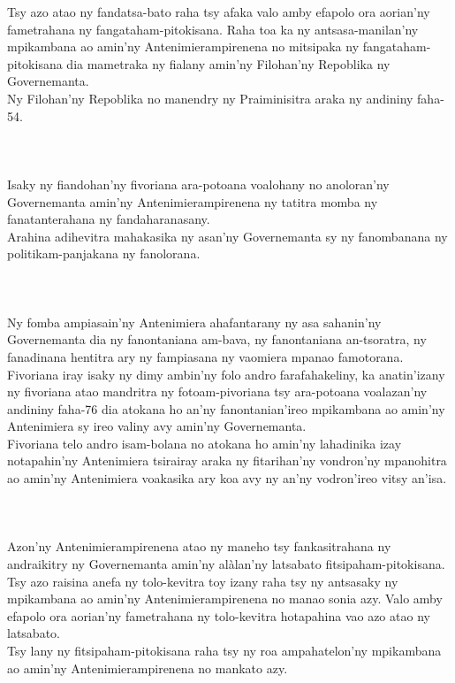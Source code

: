 \documentclass[12pt]{article}
\newcounter{laharana}
\newcommand{\andininy}[0]{
  \paragraph{%
    \NoCaseChange{%
      Andininy~\addtocounter{laharana}{1}\thelaharana.}\label{and:\thelaharana}~%
  }%
}
\begin{document}
\noindent
Tsy azo atao ny fandatsa-bato raha tsy afaka valo amby efapolo ora aorian'ny
fametrahana ny fangataham-pitokisana.  Raha toa ka ny antsasa-manilan'ny
mpikambana ao amin'ny Antenimierampirenena no mitsipaka ny fangataham-pitokisana
dia mametraka ny fialany amin'ny Filohan'ny Repoblika ny Governemanta.\\

\noindent
Ny Filohan'ny Repoblika no manendry ny Praiminisitra araka ny andininy faha- 54.

\andininy{}Isaky ny fiandohan'ny fivoriana ara-potoana voalohany no
anoloran'ny Governemanta amin'ny Antenimierampirenena ny tatitra momba ny
fanatanterahana ny fandaharanasany.\\

\noindent
Arahina adihevitra mahakasika ny asan'ny Governemanta sy ny fanombanana ny
politikam-panjakana ny fanolorana.

\andininy{}Ny fomba ampiasain'ny Antenimiera ahafantarany ny asa sahanin'ny
Governemanta dia ny fanontaniana am-bava, ny fanontaniana an-tsoratra, ny
fanadinana hentitra ary ny fampiasana ny vaomiera mpanao famotorana.\\

\noindent
Fivoriana iray isaky ny dimy ambin'ny folo andro farafahakeliny, ka anatin'izany
ny fivoriana atao mandritra ny fotoam-pivoriana tsy ara-potoana voalazan'ny
andininy faha-76 dia atokana ho an'ny fanontanian'ireo mpikambana ao amin'ny
Antenimiera sy ireo valiny avy amin'ny Governemanta.\\

\noindent
Fivoriana telo andro isam-bolana no atokana ho amin'ny lahadinika izay
notapahin'ny Antenimiera tsirairay araka ny fitarihan'ny vondron'ny mpanohitra
ao amin'ny Antenimiera voakasika ary koa avy ny an'ny vodron'ireo vitsy an'isa.

\andininy{}Azon'ny Antenimierampirenena atao ny maneho tsy fankasitrahana ny
andraikitry ny Governemanta amin'ny alàlan'ny latsabato fitsipaham-pitokisana.\\

\noindent
Tsy azo raisina anefa ny tolo-kevitra toy izany raha tsy ny antsasaky ny
mpikambana ao amin'ny Antenimierampirenena no manao sonia azy. Valo amby efapolo
ora aorian'ny fametrahana ny tolo-kevitra hotapahina vao azo atao ny latsabato.\\

\noindent
Tsy lany ny fitsipaham-pitokisana raha tsy ny roa ampahatelon'ny mpikambana ao
amin'ny Antenimierampirenena no mankato azy.\\
\end{document}
